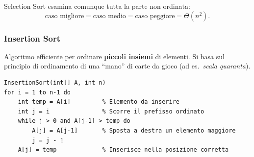 \documentclass[12pt, a4paper]{article}
\begin{document}
\begin{tcolorbox}[colback=lightergray!5, colframe=tocsubsec, title=\textbf{Il Costo Non Dipende dall'Ordine Iniziale}]
Selection Sort esamina comunque tutta la parte non ordinata:
$$\text{caso migliore} = \text{caso medio} = \text{caso peggiore} = \Theta(n^2).$$
\end{tcolorbox}

\subsubsection{Insertion Sort}

Algoritmo efficiente per ordinare \textbf{piccoli insiemi} di elementi. Si basa sul principio di ordinamento di una ``mano'' di carte da gioco (ad es.\ \textit{scala quaranta}).
\begin{verbatim}
InsertionSort(int[] A, int n)
for i = 1 to n-1 do
    int temp = A[i]         % Elemento da inserire
    int j = i               % Scorre il prefisso ordinato
    while j > 0 and A[j-1] > temp do
        A[j] = A[j-1]       % Sposta a destra un elemento maggiore
        j = j - 1
    A[j] = temp             % Inserisce nella posizione corretta
\end{verbatim}
\end{document}

